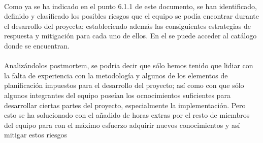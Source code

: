 \paragraph{}Como ya se ha indicado en el punto 6.1.1 de este documento, se han identificado, definido y clasificado los posibles riesgos que el equipo se podía encontrar durante el desarrollo del proyecta; estableciendo además las consiguientes estrategias de respuesta y mitigación para cada uno de ellos.
En el  se puede acceder al catálogo donde se encuentran.

\paragraph{}Analizándolos postmortem, se podria decir que sólo hemos tenido que lidiar con la falta de experiencia con la metodología y algunos de los elementos de planificación impuestos para el desarrollo del proyecto; así como con que sólo algunos integrantes del equipo poseían los ocnocimientos suficientes para desarrollar ciertas partes del proyecto, especialmente la implementación. Pero esto se ha solucionado con el añadido de horas extras por el resto de miembros del equipo para con el máximo esfuerzo adquirir nuevos conocimientos y así mitigar estos riesgos
